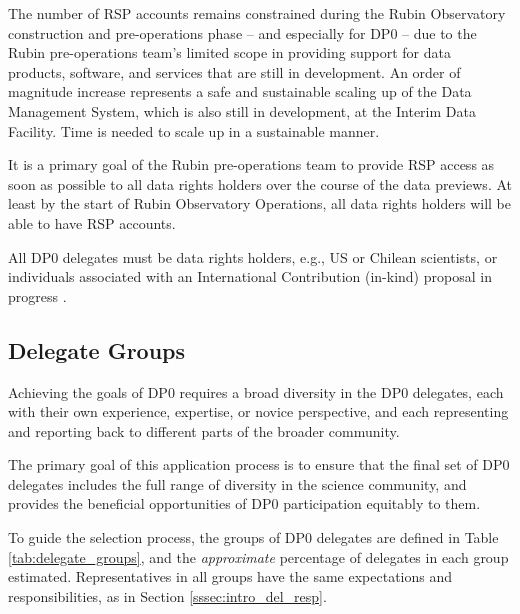 \documentclass[DM,lsstdraft,authoryear,toc]{lsstdoc}
\begin{document}
The number of RSP accounts remains constrained during the Rubin Observatory construction and pre-operations phase -- and especially for DP0 -- due to the Rubin pre-operations team's limited scope in providing support for data products, software, and services that are still in development.
An order of magnitude increase represents a safe and sustainable scaling up of the Data Management System, which is also still in development, at the Interim Data Facility.
Time is needed to scale up in a sustainable manner.

It is a primary goal of the Rubin pre-operations team to provide RSP access as soon as possible to all data rights holders over the course of the data previews. 
At least by the start of Rubin Observatory Operations, all data rights holders will be able to have RSP accounts.

All DP0 delegates must be data rights holders, e.g., US or Chilean scientists, or individuals associated with an International Contribution (in-kind) proposal in progress .

\subsection{Delegate Groups}\label{ssec:sel_grps}

Achieving the goals of DP0 requires a broad diversity in the DP0 delegates, each with their own experience, expertise, or novice perspective, and each representing and reporting back to different parts of the broader community.

The primary goal of this application process is to ensure that the final set of DP0 delegates includes the full range of diversity in the science community, and provides the beneficial opportunities of DP0 participation equitably to them.

To guide the selection process, the groups of DP0 delegates are defined in Table \ref{tab:delegate_groups}, and the \emph{approximate} percentage of delegates in each group estimated.
Representatives in all groups have the same expectations and responsibilities, as in Section \ref{sssec:intro_del_resp}.
\end{document}
